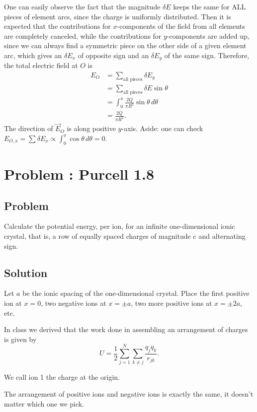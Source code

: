 \documentclass[solutions]{esg8022pset}
\begin{document}
  One can easily observe the fact that the magnitude $\delta E$ keeps the same for ALL pieces of element arcs, since the charge is uniformly distributed. Then it is expected that the contributions for $x$-components of the field from all elements are completely canceled, while the contributions for $y$-components are added up, since we can always find a symmetric piece on the other side of a given element arc, which gives an $\delta E_x$ of opposite sign and an $\delta E_y$ of the same sign.  Therefore, the total electric field at $O$ is
  \begin{align*}
    E_O & = \sum_{\text{all pieces}} \delta E_y \\
        & = \sum_{\text{all pieces}} \delta E\sin\theta \\
        & = \int_0^\pi \frac{2Q}{\pi R^2}\sin\theta\,d\theta \\
        & = \frac{2Q}{\pi R^2}.
  \end{align*}
  The direction of $\vec E_O$ is along positive $y$-axis. Aside: one can check $E_{O,x} = \sum \delta E_x \propto \int_0^\pi \cos\theta\,d\theta = 0$.
\section{Problem \thesection: Purcell 1.8}
\subsection{Problem}
  Calculate the potential energy, per ion, for an infinite one-dimensional ionic crystal, that is, a row of equally spaced charges of magnitude $e$ and alternating sign.

  \noindent [\emph{Hint}: The power series expansion of $\ln(1+x)$,
  $$\ln(1+x) = \sum_{j=1}^\infty \frac{(-x)^{j-1}}{j},$$
  may be of use.]
\subsection{Solution}
  Let $a$ be the ionic spacing of the one-dimensional crystal. Place the first positive ion at $x = 0$, two negative ions at $x = \pm a$, two more positive ions at $x = \pm 2a$, etc.

  In class we derived that the work done in assembling an arrangement of charges is given by
  $$U = \frac12 \sum_{j=1}^N\sum_{k\ne j} \frac{q_j q_k}{r_{jk}}.$$

  We call ion 1 the charge at the origin.

  The arrangement of positive ions and negative ions is exactly the same, it doesn't matter which one we pick.
\end{document}

